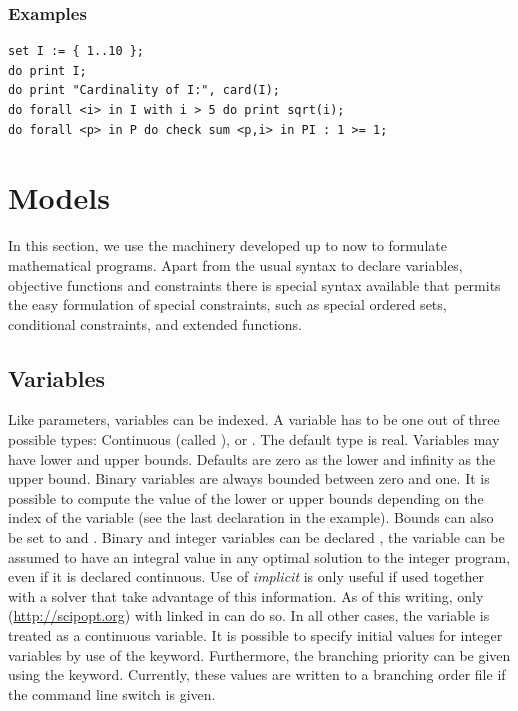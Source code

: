 \subsubsection{Examples}
{\small
\begin{verbatim}
set I := { 1..10 };
do print I;
do print "Cardinality of I:", card(I);
do forall <i> in I with i > 5 do print sqrt(i);
do forall <p> in P do check sum <p,i> in PI : 1 >= 1;
\end{verbatim}
}



\section{Models}
In this section, we use the machinery developed up to now to
formulate mathematical programs. Apart from the usual syntax to
declare variables, objective functions and constraints there is
special syntax available that permits the easy formulation of special
constraints, such as special ordered sets, conditional constraints,
and extended functions.

\subsection{Variables}
Like parameters, variables can be indexed.
A variable has to be one out of three possible types:
Continuous (called ),  or . The default type is real.
Variables may have lower and upper bounds. Defaults are
zero as the lower and infinity as the upper bound. Binary variables are
always bounded between zero and one.
It is possible to compute the value of the lower or upper bounds
depending on the index of the variable (see the last declaration in the
example). Bounds can also be set to  and .
Binary and integer variables can be declared , \ie the
variable can be assumed to have an integral value in any optimal
solution to the integer program, even if it is declared continuous.
Use of \emph{implicit} is only useful if used together with a solver
that take advantage of this information. As of this writing, only \scip
(\url{http://scipopt.org}) with linked in \zimpl can do so.
In all other cases, the variable is treated as a continuous variable.
It is possible to specify initial values for integer variables by use
of the  keyword. Furthermore, the branching  priority
can be given using the  keyword. Currently, these
values are written to a \cplex {} branching order file if the
 command line switch is given.

